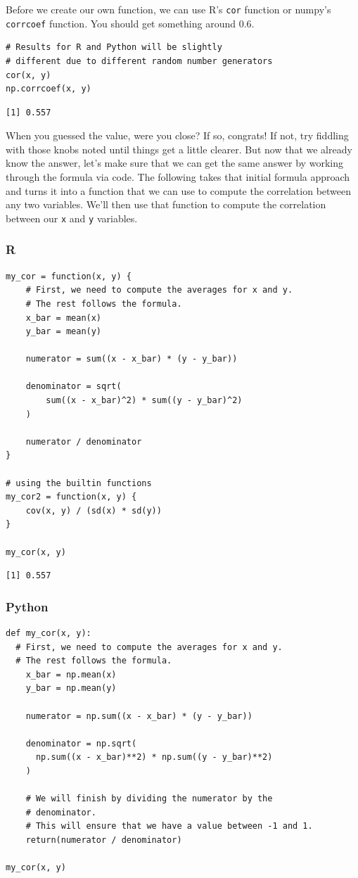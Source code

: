 \documentclass[
  letterpaper,
]{krantz}
\begin{document}
Before we create our own function, we can use R's \texttt{cor} function
or numpy's \texttt{corrcoef} function. You should get something around
0.6.

\begin{verbatim}
# Results for R and Python will be slightly
# different due to different random number generators
cor(x, y)
np.corrcoef(x, y)
\end{verbatim}

\begin{verbatim}
[1] 0.557
\end{verbatim}

When you guessed the value, were you close? If so, congrats! If not, try
fiddling with those knobs noted until things get a little clearer. But
now that we already know the answer, let's make sure that we can get the
same answer by working through the formula via code. The following takes
that initial formula approach and turns it into a function that we can
use to compute the correlation between any two variables. We'll then use
that function to compute the correlation between our \texttt{x} and
\texttt{y} variables.

\subsubsection{R}

\begin{verbatim}
my_cor = function(x, y) {
    # First, we need to compute the averages for x and y.
    # The rest follows the formula.
    x_bar = mean(x)
    y_bar = mean(y)

    numerator = sum((x - x_bar) * (y - y_bar))

    denominator = sqrt(
        sum((x - x_bar)^2) * sum((y - y_bar)^2)
    )

    numerator / denominator
}

# using the builtin functions
my_cor2 = function(x, y) {
    cov(x, y) / (sd(x) * sd(y))
}

my_cor(x, y)
\end{verbatim}

\begin{verbatim}
[1] 0.557
\end{verbatim}

\subsubsection{Python}

\begin{verbatim}
def my_cor(x, y):
  # First, we need to compute the averages for x and y.
  # The rest follows the formula.
    x_bar = np.mean(x)
    y_bar = np.mean(y)
    
    numerator = np.sum((x - x_bar) * (y - y_bar))
    
    denominator = np.sqrt(
      np.sum((x - x_bar)**2) * np.sum((y - y_bar)**2)
    )

    # We will finish by dividing the numerator by the 
    # denominator.
    # This will ensure that we have a value between -1 and 1.
    return(numerator / denominator)

my_cor(x, y)
\end{verbatim}
\end{document}
